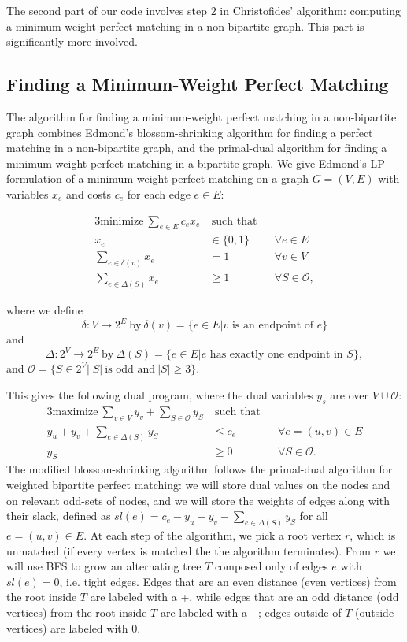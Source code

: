 \documentclass{article}
\begin{document}
The second part of our code involves step $2$ in Christofides' algorithm: computing a minimum-weight perfect matching in a non-bipartite graph. This part is significantly more involved.

\subsection{Finding a Minimum-Weight Perfect Matching}

The algorithm for finding a minimum-weight perfect matching in a non-bipartite graph combines Edmond's blossom-shrinking algorithm for finding a perfect matching in a non-bipartite graph, and the primal-dual algorithm for finding a minimum-weight perfect matching in a bipartite graph. We give Edmond's LP formulation of a minimum-weight perfect matching on a graph $G = (V, E)$ with variables $x_e$ and costs $c_e$ for each edge $e \in E$:

\begin{alignat*}{3}
	\textrm{minimize}~\sum_{e \in E} c_e x_e&~\textrm{such that}&& \\
	x_e &\in \{0, 1\}  &&\forall e \in E \\
    \sum_{e \in \delta(v)} x_e &= 1 &&\forall v \in V \\
    \sum_{e \in \Delta(S)} x_e &\geq 1 &&\forall S \in \mathcal{O},
\end{alignat*}

where we define 
$$
\delta \colon V \to 2^E~\textrm{by}~\delta(v) = \{e \in E | \textrm{$v$ is an endpoint of $e$}\}
$$ and 
$$
\Delta \colon 2^V \to 2^E~\textrm{by}~\Delta(S) = \{e \in E | \textrm{$e$ has exactly one endpoint in $S$}\},
$$
and $\mathcal{O} = \{S \in 2^V | |S|~\textrm{is odd and}~ |S| \geq 3\}$.

This gives the following dual program, where the dual variables $y_s$ are over $V \cup \mathcal{O}$:
\begin{alignat*}{3}
	\textrm{maximize}~\sum_{v \in V} y_v + \sum_{S \in \mathcal{O}} y_S&~\textrm{such that} && \\
    y_u + y_v + \sum_{e \in \Delta(S)} y_S &\leq c_e &&\forall e=(u, v) \in E \\
    y_S &\geq 0 &&\forall S \in \mathcal{O}.
\end{alignat*}
The modified blossom-shrinking algorithm follows the primal-dual algorithm for weighted bipartite perfect matching: we will store dual values on the nodes and on relevant odd-sets of nodes, and we will store the weights of edges along with their slack, defined as $sl(e) = c_e - y_u - y_v - \sum_{e \in \Delta(S)} y_S$ for all $e = (u, v) \in E$.  At each step of the algorithm, we pick a root vertex $r$, which is unmatched (if every vertex is matched the the algorithm terminates). From $r$ we will use BFS to grow an alternating tree $T$ composed only of edges $e$ with $sl(e) = 0$, i.e. tight edges. Edges that are an even distance (even vertices) from the root inside $T$ are labeled with a +, while edges that are an odd distance (odd vertices) from the root inside $T$ are labeled with a - ; edges outside of $T$ (outside vertices) are labeled with $0$.
\end{document}
